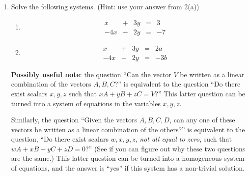 \documentclass[12pt]{article}
\begin{document}
\begin{enumerate}
\begin{enumerate}
\end{enumerate}
\newpage

\item Solve the following systems. (Hint: use your answer from 2(a))

\begin{enumerate}
 \item \[
        \begin{array}{ccccc}
         x&+&3y&=&3\\
         -4x&-&2y&=&-7
        \end{array}
       \]


\vspace{2.5in}

\item \[
       \begin{array}{ccccc}
        x&+&3y&=&2a\\
       -4x&-&2y&=&-3b
       \end{array}
      \]

\end{enumerate}
\vspace{2.5in}

\textbf{Possibly useful note}: the question ``Can the vector $V$ be written as a linear combination of the vectors $A,B,C$?'' is equivalent to the question ``Do there exist scalars $x,y,z$ such that $xA+yB+zC=V$?'' This latter question can be turned into a system of equations in the variables $x,y,z$.

Similarly, the question ``Given the vectors $A,B,C,D$, can any one of these vectors be written as a linear combination of the others?'' is equivalent to the question, ``Do there exist scalars $w,x,y,z$, {\em not all equal to zero}, such that $wA+xB+yC+zD=0$?'' (See if you can figure out why these two questions are the same.) This latter question can be turned into a homogeneous system of equations, and the answer is ``yes'' if this system has a non-trivial solution.

 \end{enumerate}
\end{document}
